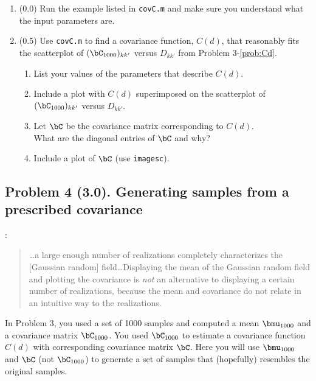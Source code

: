 \documentclass[11pt,titlepage,fleqn]{article}
\begin{document}
\begin{enumerate}
\item (0.0) Run the example listed in \verb+covC.m+ and make sure you understand what the input parameters are.


\item (0.5) Use \verb+covC.m+ to find a covariance function, $C(d)$, that reasonably fits the scatterplot of $(\bC_{1000})_{kk'}$ versus $D_{kk'}$ from Problem 3-\ref{prob:Cd}.
%
\begin{enumerate}
\item List your values of the parameters that describe $C(d)$.
\item Include a plot with $C(d)$ superimposed on the scatterplot of $(\bC_{1000})_{kk'}$ versus $D_{kk'}$.
\item Let $\bC$ be the covariance matrix corresponding to $C(d)$. \\
What are the diagonal entries of $\bC$ and why?
\item Include a plot of $\bC$ (use \verb+imagesc+).
\end{enumerate}

\label{prob:covC}

\end{enumerate}


\pagebreak
\subsection*{Problem 4 (3.0). Generating samples from a prescribed covariance}

\citet[][p.~45]{Tarantola2005}:
%
\begin{quote}
\ldots a large enough number of realizations completely characterizes the [Gaussian random] field\ldots Displaying the mean of the Gaussian random field and plotting the covariance is {\em not} an alternative to displaying a certain number of realizations, because the mean and covariance do not relate in an intuitive way to the realizations.
\end{quote}

\noindent
In Problem 3, you used a set of 1000 samples and computed a mean $\bmu_{1000}$ and a covariance matrix $\bC_{1000}$. You used $\bC_{1000}$ to estimate a covariance function $C(d)$ with corresponding covariance matrix $\bC$. Here you will use $\bmu_{1000}$ and $\bC$ (not $\bC_{1000}$) to generate a set of samples that (hopefully) resembles the original samples.
\end{document}
